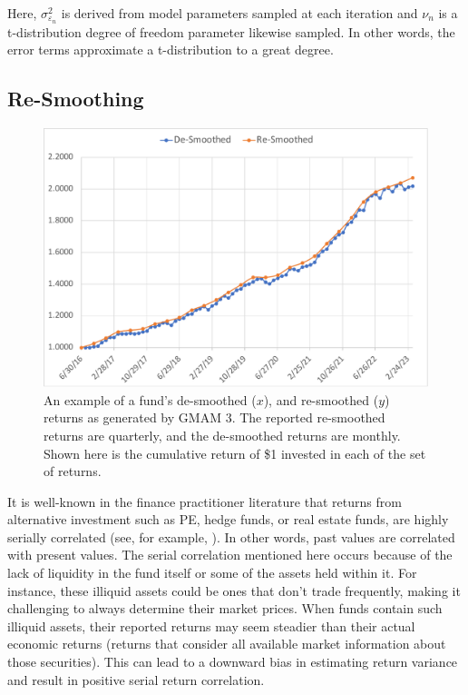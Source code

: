 \documentclass[11pt]{article}
\begin{document}
Here, $\sigma_{\varepsilon_n}^2$  is derived from model parameters sampled at each iteration and $\nu_n$  is a t-distribution degree of freedom parameter likewise sampled. In other words, the error terms approximate a t-distribution to a great degree.

\subsection{Re-Smoothing}
\label{subsec:resmoothing}

\begin{figure}[!h]
	\centering
	\includegraphics[width=400pt]{smoothed.pdf}
	\parbox{400pt}{\caption{An example of a fund’s de-smoothed ($x$), and re-smoothed ($y$) returns as generated by GMAM 3. The reported re-smoothed returns are quarterly, and the de-smoothed returns are monthly. Shown here is the cumulative return of \$1 invested in each of the set of returns. }}
\end{figure}


It is well-known in the finance practitioner literature that returns from alternative investment such as PE, hedge funds, or real estate funds, are highly serially correlated (see, for example, \cite{getmansky_etal}). In other words, past values are correlated with present values. The serial correlation mentioned here occurs because of the lack of liquidity in the fund itself or some of the assets held within it. For instance, these illiquid assets could be ones that don't trade frequently, making it challenging to always determine their market prices. When funds contain such illiquid assets, their reported returns may seem steadier than their actual economic returns (returns that consider all available market information about those securities). This can lead to a downward bias in estimating return variance and result in positive serial return correlation. \\
\end{document}
